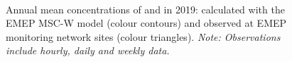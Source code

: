 \begin{figure}[H]
  \\
  \vspace{0.5cm}
\caption{Annual mean concentrations of \PM[10] and \PM[2.5] in 2019:
  calculated with the EMEP MSC-W model (colour contours) and observed
  at EMEP monitoring network sites (colour triangles). \textit{Note:
    Observations include hourly, daily and weekly data.}}
\label{fig:PMin2019}
\end{figure}


